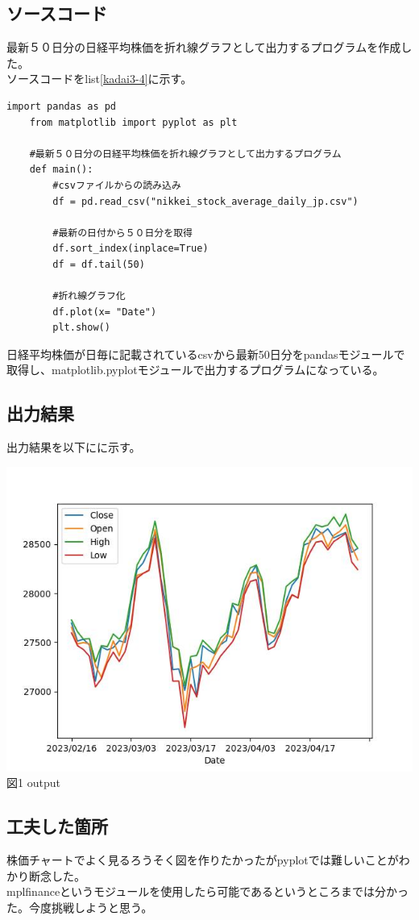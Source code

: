 \documentclass[a4paper]{ltjsarticle}
\begin{document}
\subsection*{ソースコード}
最新５０日分の日経平均株価を折れ線グラフとして出力するプログラムを作成した。
\\ソースコードをlist\ref{kadai3-4}に示す。
\begin{lstlisting}[caption=kadai3-4.py,label=kadai3-4]
    import pandas as pd
    from matplotlib import pyplot as plt
    
    #最新５０日分の日経平均株価を折れ線グラフとして出力するプログラム
    def main():
        #csvファイルからの読み込み
        df = pd.read_csv("nikkei_stock_average_daily_jp.csv")
    
        #最新の日付から５０日分を取得
        df.sort_index(inplace=True)
        df = df.tail(50)
    
        #折れ線グラフ化
        df.plot(x= "Date")
        plt.show()
\end{lstlisting}
日経平均株価が日毎に記載されているcsvから最新50日分をpandasモジュールで取得し、matplotlib.pyplotモジュールで出力するプログラムになっている。
\newpage

\subsection*{出力結果}
出力結果を以下にに示す。
\begin{center}
    \includegraphics{output3-4.jpeg} \\
    図1 output
\end{center}

\subsection*{工夫した箇所}
株価チャートでよく見るろうそく図を作りたかったがpyplotでは難しいことがわかり断念した。
\\mplfinanceというモジュールを使用したら可能であるというところまでは分かった。今度挑戦しようと思う。
\end{document}
